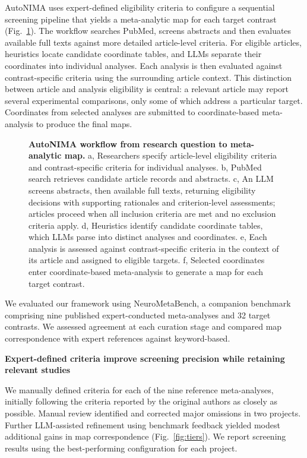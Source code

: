 AutoNIMA uses expert-defined eligibility criteria to configure a sequential screening pipeline that yields a meta-analytic map for each target contrast (Fig.~\ref{fig:workflow}). The workflow searches PubMed, screens abstracts and then evaluates available full texts against more detailed article-level criteria. For eligible articles, heuristics locate candidate coordinate tables, and LLMs separate their coordinates into individual analyses. Each analysis is then evaluated against contrast-specific criteria using the surrounding article context. This distinction between article and analysis eligibility is central: a relevant article may report several experimental comparisons, only some of which address a particular target. Coordinates from selected analyses are submitted to coordinate-based meta-analysis to produce the final maps.

\begin{figure}[htbp]
\centering
{}
\caption{\textbf{AutoNIMA workflow from research question to meta-analytic map.} a, Researchers specify article-level eligibility criteria and contrast-specific criteria for individual analyses. b, PubMed search retrieves candidate article records and abstracts. c, An LLM screens abstracts, then available full texts, returning eligibility decisions with supporting rationales and criterion-level assessments; articles proceed when all inclusion criteria are met and no exclusion criteria apply. d, Heuristics identify candidate coordinate tables, which LLMs parse into distinct analyses and coordinates. e, Each analysis is assessed against contrast-specific criteria in the context of its article and assigned to eligible targets. f, Selected coordinates enter coordinate-based meta-analysis to generate a map for each target contrast.}
\label{fig:workflow}
\end{figure}

We evaluated our framework using NeuroMetaBench, a companion benchmark comprising nine published expert-conducted meta-analyses and 32 target contrasts. We assessed agreement at each curation stage and compared map correspondence with expert references against keyword-based.

\textbf{Expert-defined criteria improve screening precision while retaining relevant studies}

We manually defined criteria for each of the nine reference meta-analyses, initially following the criteria reported by the original authors as closely as possible. Manual review identified and corrected major omissions in two projects. Further LLM-assisted refinement using benchmark feedback yielded modest additional gains in map correspondence (Fig.~\ref{fig:tiers}). We report screening results using the best-performing configuration for each project.

